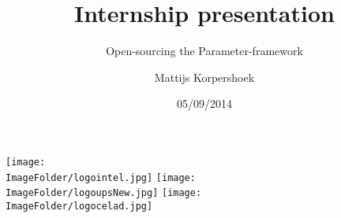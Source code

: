 %
%

\title{Internship presentation}
\subtitle{Open-sourcing the Parameter-framework}
\author{Mattijs Korpershoek}
\date{05/09/2014}

\begin{frame}
  \maketitle
{
    \texttt{[image: \\ImageFolder/logointel.jpg]}\hfill
    \texttt{[image: \\ImageFolder/logoupsNew.jpg]}
    \hfill \texttt{[image: \\ImageFolder/logocelad.jpg]}
}
\end{frame}
